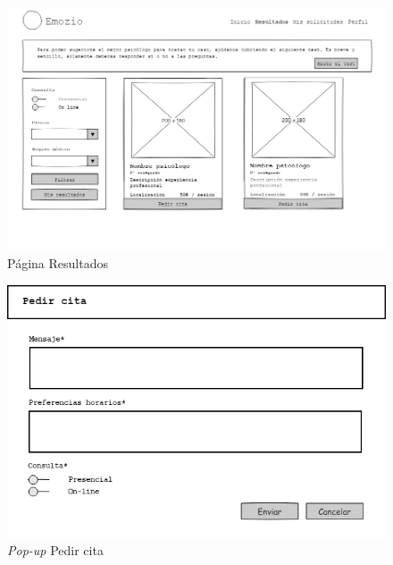 \begin{figure}[htbp] 
    \centering
    \includegraphics[width=1\textwidth]{figuras/mockup_pacientes/mis_resultados.png}
    \caption{Página Resultados}
\end{figure}	

\begin{figure}[htbp] 
    \centering
    \includegraphics[width=1\textwidth]{figuras/mockup_pacientes/pedir_cita.png}
    \caption{\textit{Pop-up} Pedir cita}
\end{figure}	

